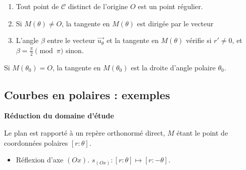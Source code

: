 \documentclass[10pt,class=article,crop=false]{standalone}
\begin{document}
\begin{multicols}{2}


\begin{theoreme}
	\sauteligne
	\begin{enumerate}
		\item Tout point de $\mathcal{C}$ distinct de l'origine $O$ est un point régulier.
		
		\item Si $M(\theta)\neq O$, la tangente en $M(\theta)$ est dirigée
		par le vecteur
		
		\item L'angle $\beta$ entre le vecteur $\overrightarrow{u_\theta}$ et la tangente
		en $M(\theta)$ vérifie  si $r'\neq 0$,
		et $\beta=\frac\pi2 \pmod \pi$ sinon.
		
	\end{enumerate}
\end{theoreme}







\begin{theoreme}
	Si $M(\theta_0)=O$, la tangente en $M(\theta_0)$ est la droite
	d'angle polaire $\theta_0$.
\end{theoreme}






\subsection{Courbes en polaires : exemples}

\textbf{Réduction du domaine d'étude}

Le plan est rapporté à un repère orthonormé direct,
$M$ étant le point de coordonnées polaires $[r:\theta]$.

\begin{itemize}
	\item Réflexion d'axe $(Ox)$. $s_{(Ox)} : [r:\theta] \mapsto [r:-\theta]$.
	

\end{itemize}
\end{multicols}
\end{document}
